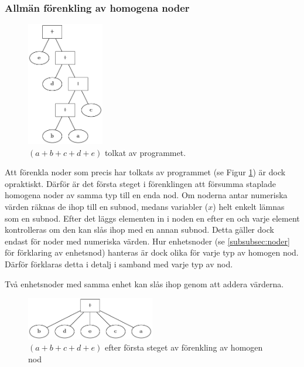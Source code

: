 \documentclass[12pt,a4paper]{article}
\begin{document}
\subsubsection{Allmän förenkling av homogena noder}
\label{subsubsec:förenkling_homogena}
\begin{figure}[h]
  \centering
  \includegraphics[width=0.3\textwidth]{image22}
  \caption{\((a + b + c + d + e)\) tolkat av programmet.}
  \label{fig:2311}
\end{figure}
Att förenkla noder som precis har tolkats av programmet (se Figur \ref{fig:2311}) är dock opraktiskt. Därför är det första steget i förenklingen att försumma staplade homogena noder av samma typ till en enda nod. Om noderna antar numeriska värden räknas de ihop till en subnod, medans variabler (\(x\)) helt enkelt lämnas som en subnod. Efter det läggs elementen in i noden en efter en och varje element kontrolleras om den kan slås ihop med en annan subnod. Detta gäller dock endast för noder med numeriska värden. Hur enhetsnoder (se \ref{subsubsec:noder} för förklaring av enhetsnod) hanteras är dock olika för varje typ av homogen nod. Därför förklaras detta i detalj i samband med varje typ av nod.\par
Två enhetsnoder med samma enhet kan slås ihop genom att addera värderna.
\begin{figure}[h]
  \centering
  \includegraphics[width=0.5\textwidth]{image16}
  \caption{\((a + b + c + d + e)\) efter första steget av förenkling av homogen nod}
  \label{fig:2312}
\end{figure}
\end{document}
